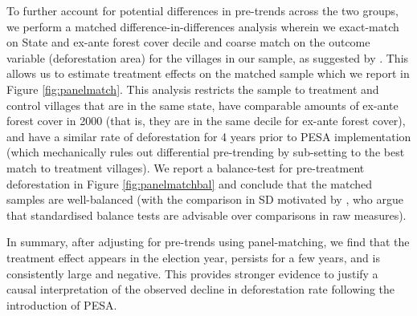 \documentclass[12pt,reqno]{article}
\begin{document}
To further account for potential differences in pre-trends across the two groups, we perform a matched difference-in-differences analysis wherein we exact-match on State and ex-ante forest cover decile and coarse match on the outcome variable (deforestation area) for the villages in our sample, as suggested by \textcite[]{Imai2019-kp}. This allows us to estimate treatment effects on the matched sample which we report in Figure \ref{fig:panelmatch}. This analysis restricts the sample to treatment and control villages that are in the same state, have comparable amounts of ex-ante forest cover in 2000 (that is, they are in the same decile for ex-ante forest cover), and have a similar rate of deforestation for 4 years prior to PESA implementation (which mechanically rules out differential pre-trending by sub-setting to the best match to treatment villages). We report a balance-test for pre-treatment deforestation in Figure \ref{fig:panelmatchbal} and conclude that the matched samples are well-balanced (with the comparison in SD motivated by \textcite[]{imbens2015causal}, who argue that standardised balance tests are advisable over comparisons in raw measures).

In summary, after adjusting for pre-trends using panel-matching, we find that the treatment effect appears in the election year, persists for a few years, and is consistently large and negative. This provides stronger evidence to justify a causal interpretation of the observed decline in deforestation rate following the introduction of PESA. 

\end{document}
